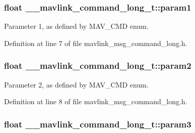 \hypertarget{struct____mavlink__command__long__t_a8bb82d921422fd825276bbc43502fc77}{
\subsubsection[{param1}]{\setlength{\rightskip}{0pt plus 5cm}float \-\_\-\-\_\-mavlink\-\_\-command\-\_\-long\-\_\-t\-::param1}}\label{struct____mavlink__command__long__t_a8bb82d921422fd825276bbc43502fc77}


Parameter 1, as defined by M\-A\-V\-\_\-\-C\-M\-D enum. 



Definition at line 7 of file mavlink\-\_\-msg\-\_\-command\-\_\-long.\-h.

\hypertarget{struct____mavlink__command__long__t_a715bfae8c34e8882b82efbb2bd0e580c}{
\subsubsection[{param2}]{\setlength{\rightskip}{0pt plus 5cm}float \-\_\-\-\_\-mavlink\-\_\-command\-\_\-long\-\_\-t\-::param2}}\label{struct____mavlink__command__long__t_a715bfae8c34e8882b82efbb2bd0e580c}


Parameter 2, as defined by M\-A\-V\-\_\-\-C\-M\-D enum. 



Definition at line 8 of file mavlink\-\_\-msg\-\_\-command\-\_\-long.\-h.

\hypertarget{struct____mavlink__command__long__t_a9b11618cd6d409944727cfcc0d637f72}{
\subsubsection[{param3}]{\setlength{\rightskip}{0pt plus 5cm}float \-\_\-\-\_\-mavlink\-\_\-command\-\_\-long\-\_\-t\-::param3}}\label{struct____mavlink__command__long__t_a9b11618cd6d409944727cfcc0d637f72}


